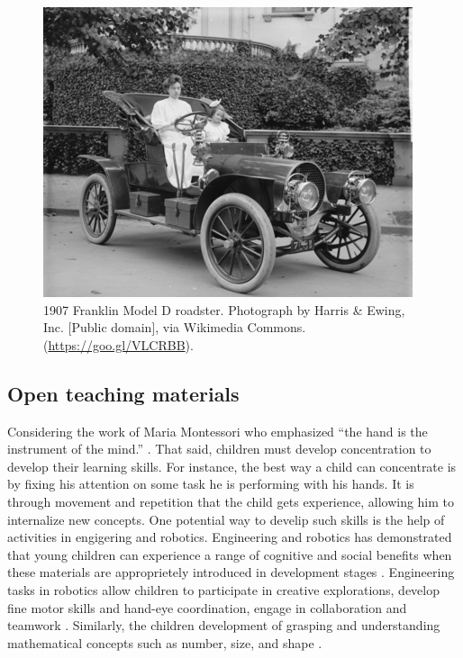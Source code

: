 \documentclass[sigconf]{acmart}
\begin{document}
\begin{figure}[h]
  \centering
  \includegraphics[width=\linewidth]{sample-franklin}
  \caption{1907 Franklin Model D roadster. Photograph by Harris \&
    Ewing, Inc. [Public domain], via Wikimedia
    Commons. (\url{https://goo.gl/VLCRBB}).}
  \label{fig:car}
\end{figure}

\subsection{Open teaching materials}
Considering the work of Maria Montessori who emphasized “the hand is the instrument of the mind.” \cite{montessori2013absorbent}. 
That said, children must develop concentration to develop their learning skills. 
For instance, the best way a child can concentrate is by fixing his attention on some task he is performing with his hands. 
It is through movement and repetition that the child gets experience, allowing him to internalize new concepts. 
One potential way to develip such skills is the help of activities in engigering and robotics. 
Engineering and robotics has demonstrated that young children can experience a range of cognitive and social benefits when these materials are approprietely introduced in development stages \cite{bers2008, bers-horn2010, kazakoff-bers2012}.
Engineering tasks in robotics allow children to participate in creative explorations, develop fine motor skills and hand-eye coordination, engage in collaboration and teamwork \cite{elkin2014}.
Similarly, the children development of grasping and understanding mathematical concepts such as number, size, and shape \cite{bers2012, resnick1998}.
\end{document}
